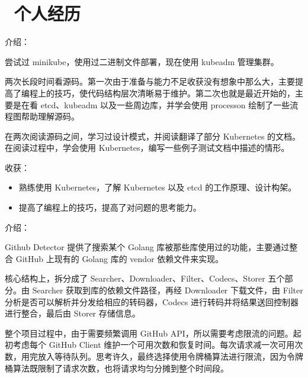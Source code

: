\documentclass{resume}
\begin{document}
\section{\faUsers\ 个人经历} \vspace{1mm}


\vspace{1mm}\par
\noindent
介绍：
\vspace{1mm}\par
\setlength{\parindent}{2ex}
尝试过 minikube，使用过二进制文件部署，现在使用 kubeadm 管理集群。\vspace{1mm}\par
两次长段时间看源码。第一次由于准备与能力不足收获没有想象中那么大，主要提高了编程上的技巧，使代码结构层次清晰易于维护。第二次也就是最近开始的，主要是在看 etcd、kubeadm 以及一些周边库，并学会使用 processon 绘制了一些流程图帮助理解源码。\vspace{1mm}\par
在两次阅读源码之间，学习过设计模式，并阅读翻译了部分 Kubernetes 的文档。在阅读过程中，学会使用 Kubernetes，编写一些例子测试文档中描述的情形。\vspace{1mm}\par

\vspace{2mm}\par
\noindent
收获：
\begin{itemize}[parsep=1mm]
	\item 熟练使用 Kubernetes，了解 Kubernetes 以及 etcd 的工作原理、设计构架。
	\item 提高了编程上的技巧，提高了对问题的思考能力。
\end{itemize}

\faLink {}

\vspace{1mm}\par
\noindent
介绍：

\vspace{1mm}\par
\setlength{\parindent}{2ex}
Github Detector 提供了搜索某个 Golang 库被那些库使用过的功能，主要通过整合 GitHub 上现有的 Golang 库的 vendor 依赖文件来实现。\par
核心结构上，拆分成了 Searcher、Downloader、Filter、Codecs、Storer 五个部分。由 Searcher 获取到库的依赖文件路径，再经 Downloader 下载文件，由 Filter 分析是否可以解析并分发给相应的转码器，Codecs 进行转码并将结果送回控制器进行整合，最后由 Storer 存储信息。\par
整个项目过程中，由于需要频繁调用 GitHub API，所以需要考虑限流的问题。起初考虑每个 GitHub Client 维护一个可用次数和恢复时间。每次请求减一次可用次数，用完放入等待队列。思考许久，最终选择使用令牌桶算法进行限流，因为令牌桶算法既限制了请求次数，也将请求均匀分摊到整个时间段。
\end{document}
